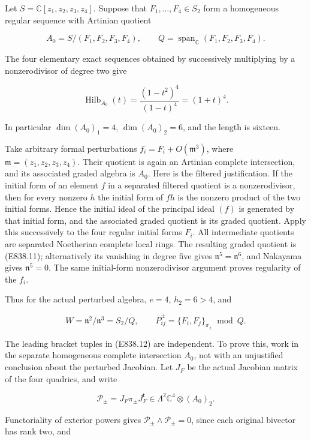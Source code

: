 Let \(S=\mathbb C[z_1,z_2,z_3,z_4]\). Suppose that
\(F_1,\ldots,F_4\in S_2\) form a homogeneous regular sequence with
Artinian quotient

\[
 A_0=S/(F_1,F_2,F_3,F_4),\qquad
 Q=\operatorname{span}_{\mathbb C}(F_1,F_2,F_3,F_4).
 \tag{E838.10}
\]

The four elementary exact sequences obtained by successively multiplying
by a nonzerodivisor of degree two give

\[
 \operatorname{Hilb}_{A_0}(t)
       =\frac{(1-t^2)^4}{(1-t)^4}=(1+t)^4.
 \tag{E838.11}
\]

In particular \(\dim(A_0)_1=4\), \(\dim(A_0)_2=6\), and the length is
sixteen.

Take arbitrary formal perturbations \(f_i=F_i+O(\mathfrak m^3)\), where
\(\mathfrak m=(z_1,z_2,z_3,z_4)\). Their quotient is again an Artinian
complete intersection, and its associated graded algebra is \(A_0\).
Here is the filtered justification. If the initial form of an element
\(f\) in a separated filtered quotient is a nonzerodivisor, then for
every nonzero \(h\) the initial form of \(fh\) is the nonzero product of
the two initial forms. Hence the initial ideal of the principal ideal
\((f)\) is generated by that initial form, and the associated graded
quotient is its graded quotient. Apply this successively to the four
regular initial forms \(F_i\). All intermediate quotients are separated
Noetherian complete local rings. The resulting graded quotient is
(E838.11); alternatively its vanishing in degree five gives
\(\mathfrak n^5=\mathfrak n^6\), and Nakayama gives \(\mathfrak n^5=0\).
The same initial-form nonzerodivisor argument proves regularity of the
\(f_i\).

Thus for the actual perturbed algebra, \(e=4\), \(h_2=6>4\), and

\[
 W=\mathfrak n^2/\mathfrak n^3=S_2/Q,\qquad
 \overline P^\pm_{ij}=\{F_i,F_j\}_{\pi_\pm}\bmod Q.
 \tag{E838.12}
\]

The leading bracket tuples in (E838.12) are independent. To prove this,
work in the separate homogeneous complete intersection \(A_0\), not with
an unjustified conclusion about the perturbed Jacobian. Let \(J_F\) be
the actual Jacobian matrix of the four quadrics, and write

\[
 \mathcal P_\pm=J_F\pi_\pm J_F^{\mathsf t}
       \in\Lambda^2\mathbb C^4\otimes(A_0)_2.
 \tag{E838.13}
\]

Functoriality of exterior powers gives
\(\mathcal P_\pm\wedge\mathcal P_\pm=0\), since each original bivector
has rank two, and

